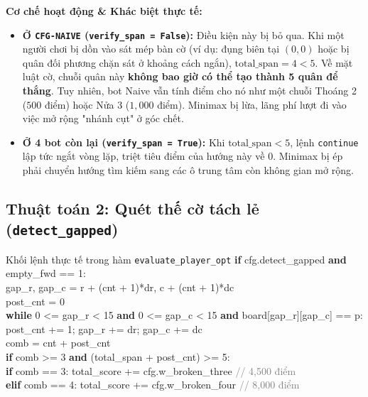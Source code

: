 \documentclass[11pt,a4paper]{article}
\begin{document}
\textbf{Cơ chế hoạt động \& Khác biệt thực tế:}
\begin{itemize}
    \item \textbf{Ở \texttt{CFG-NAIVE} (\texttt{verify\_span = False}):} Điều kiện này bị bỏ qua. Khi một người chơi bị dồn vào sát mép bàn cờ (ví dụ: đụng biên tại $(0,0)$ hoặc bị quân đối phương chặn sát ở khoảng cách ngắn), $\text{total\_span} = 4 < 5$. Về mặt luật cờ, chuỗi quân này \textbf{không bao giờ có thể tạo thành 5 quân để thắng}. Tuy nhiên, bot Naive vẫn tính điểm cho nó như một chuỗi Thoáng 2 ($500$ điểm) hoặc Nửa 3 ($1{,}000$ điểm). Minimax bị lừa, lãng phí lượt đi vào việc mở rộng "nhánh cụt" ở góc chết.
    \item \textbf{Ở 4 bot còn lại (\texttt{verify\_span = True}):} Khi $\text{total\_span} < 5$, lệnh \texttt{continue} lập tức ngắt vòng lặp, triệt tiêu điểm của hướng này về $0$. Minimax bị ép phải chuyển hướng tìm kiếm sang các ô trung tâm còn không gian mở rộng.
\end{itemize}

\subsection{Thuật toán 2: Quét thế cờ tách lẻ (\texttt{detect\_gapped})}
\begin{codebox}{Khối lệnh thực tế trong hàm \texttt{evaluate\_player\_opt}}
\small\ttfamily
\textbf{if} cfg.detect\_gapped \textbf{and} empty\_fwd == 1:\\
\quad gap\_r, gap\_c = r + (cnt + 1)*dr, c + (cnt + 1)*dc\\
\quad post\_cnt = 0\\
\quad \textbf{while} 0 <= gap\_r < 15 \textbf{and} 0 <= gap\_c < 15 \textbf{and} board[gap\_r][gap\_c] == p:\\
\quad\quad post\_cnt += 1; gap\_r += dr; gap\_c += dc\\
\quad comb = cnt + post\_cnt\\
\quad \textbf{if} comb >= 3 \textbf{and} (total\_span + post\_cnt) >= 5:\\
\quad\quad \textbf{if} comb == 3: total\_score += cfg.w\_broken\_three \hfill\textcolor{gray}{// 4,500 điểm}\\
\quad\quad \textbf{elif} comb == 4: total\_score += cfg.w\_broken\_four \hfill\textcolor{gray}{// 8,000 điểm}
\end{codebox}
\end{document}
